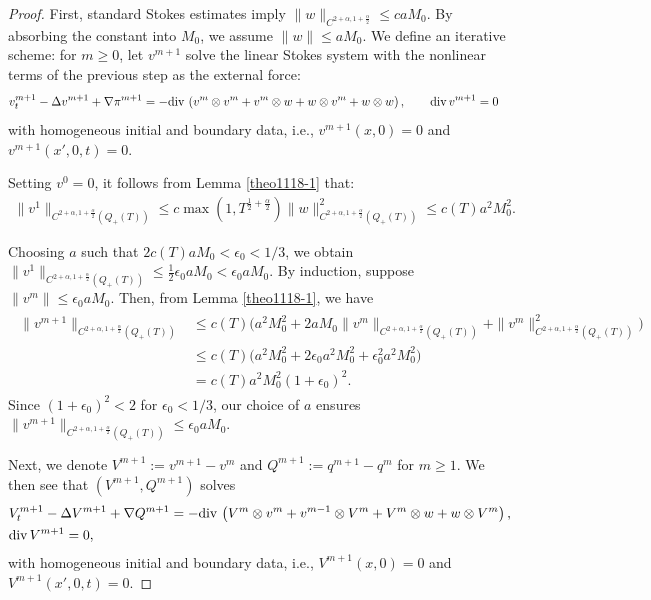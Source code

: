 \documentclass{amsart}
\numberwithin{equation}{section}
\newcommand{\ep}{{ \epsilon  }}
\newcommand {\al}{\alpha}
\begin{document}
\begin{proof}
First, standard Stokes estimates imply $\|w\|_{C^{2+\alpha, 1+\frac{\alpha}{2}}} \leq c a M_0$. By absorbing the constant into $M_0$, we assume $\|w\| \leq a M_0$. We define an iterative scheme: for $m \geq 0$, let $v^{m+1}$ solve the linear Stokes system with the nonlinear terms of the previous step as the external force:
\begin{align*}
&v^{m+1}_t-\Delta v^{m+1}+\nabla \pi^{m+1}=-{\rm div}\,\left(v^{m}\otimes v^{m}+v^{m}\otimes w+w\otimes v^{m}+w\otimes w \right), \qquad {\rm div} \, v^{m+1} =0
\end{align*}
with homogeneous initial and boundary data, i.e., $v^{m+1}(x,0)=0$ and $v^{m+1}(x', 0,t)=0$.


Setting $v^0 = 0$, it follows from Lemma  \ref{theo1118-1} that: 
\begin{align*}%
\| v^1\|_{ C^{2+\al, 1 +\frac{\al}2} ( Q_+ (T) ) } \leq c \max(1, T^{\frac12 +\frac{\al}2}) \| w\|^2_{ C^{2 + \al, 1+ \frac{\al}2} ( Q_+ (T) ) } \leq c(T) a^2 M_0^2.
\end{align*}

Choosing $a$ such that $2c(T) a M_0 < \epsilon_0 < 1/3$, we obtain $\| v^1 \|_{ C^{2+\al, 1 +\frac{\al}2} ( Q_+ (T) ) } \leq \frac{1}{2} \epsilon_0 a M_0 < \epsilon_0 a M_0$. By induction, suppose $\| v^m \| \leq \epsilon_0 a M_0$. Then, from   Lemma \ref{theo1118-1}, we have  
\begin{align*}
\begin{split}
\| v^{m+1}\|_{ C^{2+\al, 1 +\frac{\al}2} ( Q_+ (T) ) } 
& \leq c(T) \Big( a^2 M_0^2 + 2a M_0 \| v^m \|_{ C^{2 +\al, 1 +\frac{\al}2} ( Q_+ (T) ) } + \| v^m\|^2_{ C^{2 +\al, 1 +\frac{\al}2} ( Q_+ (T) ) } \Big)\\
& \leq c(T) \Big( a^2 M_0^2 + 2\ep_0 a^2 M_0^2 + \ep_0^2 a^2 M_0^2 \Big)\\
& = c(T) a^2 M_0^2 (1 + \ep_0)^2.
\end{split}
\end{align*}
Since $(1+\epsilon_0)^2 < 2$ for $\epsilon_0 < 1/3$, our choice of $a$ ensures $\| v^{m+1} \|_{ C^{2+\al, 1 +\frac{\al}2} ( Q_+ (T) ) } \leq \epsilon_0 a M_0$.



Next, we denote $V^{m+1}:=v^{m+1}-v^{m}$ and $Q^{m+1}:=q^{m+1}-q^{m}$ for $m\ge 1$. We then see that $(V^{m+1}, Q^{m+1})$ solves
\begin{align*}
\begin{split}
& V^{m+1}_t-\Delta V^{m+1}+\nabla Q^{m+1}=-{\rm div}\,\left(V^{m}\otimes v^{m}+v^{m-1}\otimes V^{m}+V^{m}\otimes w+w\otimes V^{m}\right),\\
& {\rm div} \, V^{m+1} =0,
\end{split}
\end{align*}
with homogeneous initial and boundary data, i.e., $V^{m+1}(x,0)=0$ and $V^{m+1}(x',0,t)=0$. 


\end{proof}
\end{document}

